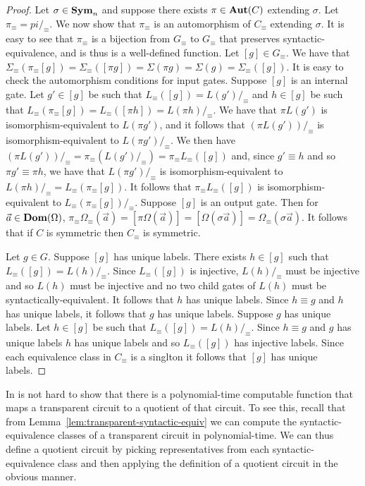 \documentclass[../paper.tex]{subfiles}
\begin{document}
\begin{proof}
  Let $\sigma \in \text{\textbf{Sym}}_n$ and suppose there exists $\pi \in \text{\textbf{Aut}}(C)$ extending
  $\sigma$. Let $\pi_\equiv = pi /_\equiv$. We now show that $\pi_\equiv$ is an
  automorphism of $C_\equiv$ extending $\sigma$. It is easy to see that
  $\pi_\equiv$ is a bijection from $G_\equiv$ to $G_\equiv$ that preserves
  syntactic-equivalence, and is thus is a well-defined function. Let $[g] \in
  G_\equiv$. We have that $\Sigma_\equiv (\pi_\equiv [g]) = \Sigma_\equiv ([\pi
  g]) = \Sigma (\pi g) = \Sigma (g) = \Sigma_\equiv ([g])$. It is easy to check
  the automorphism conditions for input gates. Suppose $[g]$ is an internal
  gate. Let $g' \in [g]$ be such that $L_\equiv([g]) = L(g') /_\equiv$ and $h
  \in [g]$ be such that $L_\equiv(\pi_\equiv[g]) = L_\equiv ([\pi h]) = L(\pi h)
  /_\equiv$. We have that $\pi L(g')$ is isomorphism-equivalent to $L(\pi g')$,
  and it follows that $(\pi L(g'))/_\equiv$ is isomorphism-equivalent to $L(\pi
  g') /_\equiv$. We then have $(\pi L(g'))/_\equiv = \pi_\equiv (L(g') /_\equiv)
  = \pi_\equiv L_\equiv ([g])$ and, since $g' \equiv h$ and so $\pi g' \equiv
  \pi h$, we have that $L(\pi g')/_\equiv$ is isomorphism-equivalent to $L(\pi
  h) /_\equiv = L_\equiv(\pi_\equiv[g])$. It follows that $\pi_\equiv L_\equiv
  ([g])$ is isomorphism-equivalent to $L_\equiv(\pi_\equiv [g]) /_\equiv$.
  Suppose $[g]$ is an output gate. Then for $\vec{a} \in \text{\textbf{Dom}} (\Omega)$,
  $\pi_\equiv \Omega_\equiv (\vec{a}) = [\pi \Omega (\vec{a})] = [\Omega (\sigma
  \vec{a})] = \Omega_\equiv (\sigma \vec{a})$. It follows that if $C$ is
  symmetric then $C_\equiv$ is symmetric.

  Let $g \in G$. Suppose $[g]$ has unique labels. There exists $h \in [g]$ such
  that $L_\equiv([g]) = L(h) /_\equiv$. Since $L_\equiv([g])$ is injective,
  $L(h) /_\equiv$ must be injective and so $L(h)$ must be injective and no two
  child gates of $L(h)$ must be syntactically-equivalent. It follows that $h$
  has unique labels. Since $h \equiv g$ and $h$ has unique labels, it follows
  that $g$ has unique labels. Suppose $g$ has unique labels. Let $h \in [g]$ be
  such that $L_\equiv([g]) = L(h) /_\equiv$. Since $h \equiv g$ and $g$ has
  unique labels $h$ has unique labels and so $L_\equiv([g])$ has injective
  labels. Since each equivalence class in $C_\equiv$ is a singlton it follows
  that $[g]$ has unique labels.
\end{proof}

In is not hard to show that there is a polynomial-time computable function that
maps a transparent circuit to a quotient of that circuit. To see this, recall
that from Lemma~\ref{lem:transparent-syntactic-equiv} we can compute the
syntactic-equivalence classes of a transparent circuit in polynomial-time. We
can thus define a quotient circuit by picking representatives from each
syntactic-equivalence class and then applying the definition of a quotient
circuit in the obvious manner.
\end{document}
